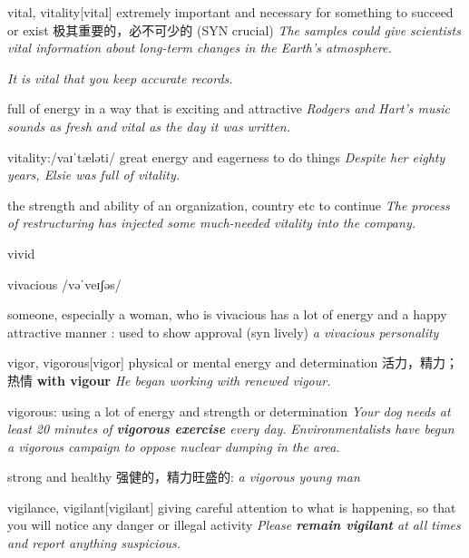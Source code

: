 \begin{DefWord}{vital, vitality}[vital]
    extremely important and necessary for something to succeed or exist 极其重要的，必不可少的 (SYN  crucial)
    \textit{The samples could give scientists vital information about long-term changes in the Earth's atmosphere.}

    \textit{It is vital that you keep accurate records.}

    full of energy in a way that is exciting and attractive
    \textit{Rodgers and Hart's music sounds as fresh and vital as the day it was written.}

    vitality:/vaɪˈtæləti/
    great energy and eagerness to do things
    \textit{Despite her eighty years, Elsie was full of vitality.}

    the strength and ability of an organization, country etc to continue
    \textit{The process of restructuring has injected some much-needed vitality into the company.}
\end{DefWord}

\begin{DefWord}{vivid}
\end{DefWord}

\begin{DefWord}{vivacious}
    /vəˈveɪʃəs/

    someone, especially a woman, who is vivacious has a lot of energy and a happy attractive manner : used to show approval (syn lively)
    \textit{a vivacious personality}
\end{DefWord}

\begin{DefWord}{vigor, vigorous}[vigor]
    physical or mental energy and determination 活力，精力；热情
    \textbf{with vigour}
    \textit{He began working with renewed vigour.}

    vigorous: using a lot of energy and strength or determination
    \textit{Your dog needs at least 20 minutes of \textbf{vigorous exercise} every day.}
    \textit{Environmentalists have begun a vigorous campaign to oppose nuclear dumping in the area.}

    strong and healthy 强健的，精力旺盛的:
    \textit{a vigorous young man}
\end{DefWord}

\begin{DefWord}{vigilance, vigilant}[vigilant]
    giving careful attention to what is happening, so that you will notice any danger or illegal activity
    \textit{Please \textbf{remain vigilant} at all times and report anything suspicious.}
\end{DefWord}
